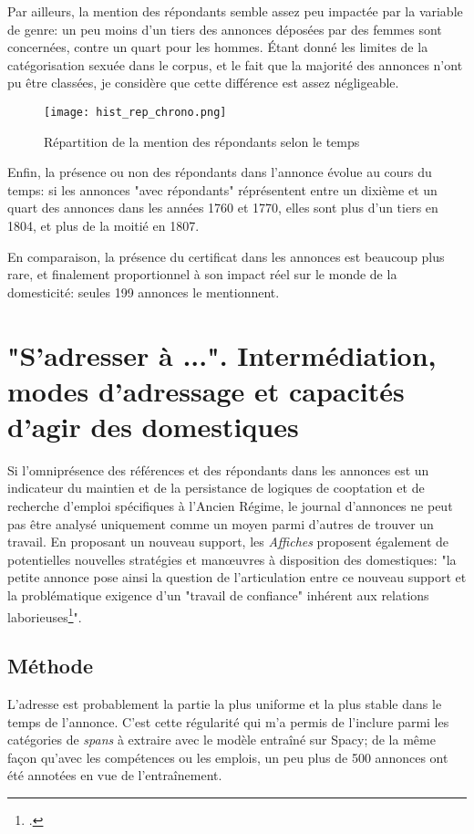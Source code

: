 Par ailleurs, la mention des répondants semble assez peu impactée par la variable de genre: un peu moins d'un tiers des annonces déposées par des femmes sont concernées, contre un quart pour les hommes. Étant donné les limites de la catégorisation sexuée dans le corpus, et le fait que la majorité des annonces n'ont pu être classées, je considère que cette différence est assez négligeable. 


\begin{figure}[h]
	\centering
	\texttt{[image: hist\_rep\_chrono.png]}
	\caption{Répartition de la mention des répondants selon le temps}
\end{figure}

Enfin, la présence ou non des répondants dans l'annonce évolue au cours du temps: si les annonces "avec répondants" réprésentent entre un dixième et un quart des annonces dans les années 1760 et 1770, elles sont plus d'un tiers en 1804, et plus de la moitié en 1807. 

En comparaison, la présence du certificat dans les annonces est beaucoup plus rare, et finalement proportionnel à son impact réel sur le monde de la domesticité: seules 199 annonces le mentionnent.


\chapter{"S'adresser à ...". Intermédiation, modes d'adressage et capacités d'agir des domestiques}

Si l'omniprésence des références et des répondants dans les annonces est un indicateur du maintien et de la persistance de logiques de cooptation et de recherche d'emploi spécifiques à l'Ancien Régime, le journal d'annonces ne peut pas être analysé uniquement comme un moyen parmi d'autres de trouver un travail. En proposant un nouveau support, les \textit{Affiches} proposent également de potentielles nouvelles stratégies et manœuvres à disposition des domestiques: "la petite annonce pose ainsi la question de l’articulation entre ce nouveau support et la problématique exigence d’un "travail de confiance" inhérent aux relations laborieuses\footcites{kramplAdresserClercHuissier2017}". 


\section{Méthode}

L'adresse est probablement la partie la plus uniforme et la plus stable dans le temps de l'annonce. C'est cette régularité qui m'a permis de l'inclure parmi les catégories de \textit{spans} à extraire avec le modèle entraîné sur Spacy; de la même façon qu'avec les compétences ou les emplois, un peu plus de 500 annonces ont été annotées en vue de l'entraînement.  

